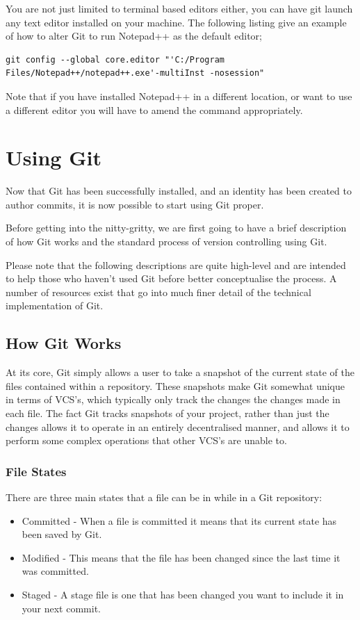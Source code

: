 \documentclass[11pt, a4paper, titlepage]{article}
\begin{document}
You are not just limited to terminal based editors either, you can have git
launch any text editor installed on your machine.
The following listing give an example of how to alter Git to run  Notepad++ as
the default editor;

\begin{lstlisting}[label=lst_config_note,
caption=Updating the defualt Git editor to Notepad++]
 git config --global core.editor "'C:/Program Files/Notepad++/notepad++.exe'-multiInst -nosession" 
\end{lstlisting}

Note that if you have installed Notepad++ in a different location, or want to
use a different editor you will have to amend the command appropriately.



\section{Using Git}
Now that Git has been successfully installed, and an identity has been created
to author commits, it is now possible to start using Git proper.

Before getting into the nitty-gritty, we are first going to have a brief
description of how Git works and the standard process of version controlling
using Git. 

Please note that the following descriptions are quite high-level and are
intended to help those who haven't used Git before better conceptualise the
process. A number of resources exist that go into much finer detail of the
technical implementation of Git.

\subsection{How Git Works}
At its core, Git simply allows a user to take a snapshot of the current state
of the files contained within a repository.
These snapshots make Git somewhat unique in terms of VCS's, which typically
only track the changes the changes made in each file.
The fact Git tracks snapshots of your project, rather than just the changes
allows it to operate in an entirely decentralised manner, and allows it to
perform some complex operations that other VCS's are unable to.

\subsubsection{File States}
There are three main states that a file can be in while in a Git repository:
\begin{itemize}
\item Committed - When a file is committed it means that its current state has
been saved by Git.
\item Modified - This means that the file has been changed since the last time
it was committed.
\item Staged - A stage file is one that has been changed you want to include
it in your next commit.
\end{itemize}
\end{document}
